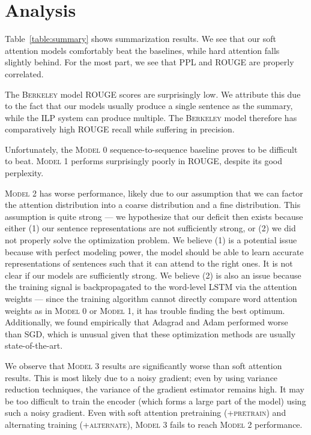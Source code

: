 \documentclass[12pt]{report}
\begin{document}
\section{Analysis}


Table~\ref{table:summary} shows summarization results. We see that our soft attention models comfortably beat the baselines, while hard attention falls slightly behind.
For the most part, we see that PPL and ROUGE are properly correlated. 

The \textsc{Berkeley} model ROUGE scores are surprisingly low. We attribute this due to the fact that our models usually produce a single sentence as the summary, while the ILP system can produce multiple. The \textsc{Berkeley} model therefore has comparatively high ROUGE recall while suffering in precision. 

Unfortunately, the \textsc{Model 0} sequence-to-sequence baseline proves to be difficult to beat. \textsc{Model 1} performs surprisingly poorly in ROUGE, despite its good perplexity.


\textsc{Model 2} has worse performance, likely due to our assumption that we can factor the attention distribution into a coarse distribution and a fine distribution.
This assumption is quite strong --- we hypothesize that our deficit then exists because either (1) our sentence representations are not sufficiently strong, or (2) we did not properly solve the optimization problem.
We believe (1) is a potential issue because with perfect modeling power, the model should be able to learn accurate representations of sentences such that it can attend to the right ones. It is not clear if our models are sufficiently strong.
We believe (2) is also an issue because the training signal is backpropagated to the word-level LSTM via the attention weights --- since the training algorithm cannot directly compare word attention weights as in \textsc{Model 0} or \textsc{Model 1}, it has trouble finding the best optimum.
Additionally, we found empirically that Adagrad and Adam performed worse than SGD, which is unusual given that these optimization methods are usually state-of-the-art.

We observe that \textsc{Model 3} results are significantly worse than soft attention results. This is most likely due to a noisy gradient; even by using variance reduction techniques, the variance of the gradient estimator remains high. It may be too difficult to train the encoder (which forms a large part of the model) using such a noisy gradient. Even with soft attention pretraining (\textsc{+pretrain}) and alternating training (\textsc{+alternate}), \textsc{Model 3} fails to reach \textsc{Model 2} performance.
\end{document}

